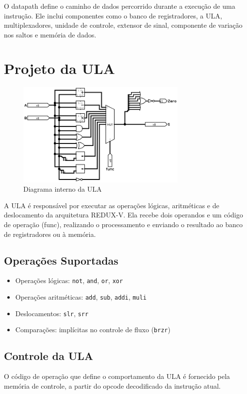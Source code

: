 \documentclass[12pt]{article}
\begin{document}
O datapath define o caminho de dados percorrido durante a execução de uma instrução. Ele inclui componentes como o banco de registradores, a ULA, multiplexadores, unidade de controle, extensor de sinal, componente de variação nos saltos e memória de dados.

\section{Projeto da ULA}

\begin{figure}[H]
\centering
\includegraphics[width=0.75\textwidth]{images/ALU.png}
\caption{Diagrama interno da ULA}
\label{fig:ula}
\end{figure}

A ULA é responsável por executar as operações lógicas, aritméticas e de deslocamento da arquitetura REDUX-V. Ela recebe dois operandos e um código de operação (func), realizando o processamento e enviando o resultado ao banco de registradores ou à memória.

\subsection{Operações Suportadas}
\begin{itemize}
  \item Operações lógicas: \texttt{not}, \texttt{and}, \texttt{or}, \texttt{xor}
  \item Operações aritméticas: \texttt{add}, \texttt{sub}, \texttt{addi}, \texttt{muli}
  \item Deslocamentos: \texttt{slr}, \texttt{srr}
  \item Comparações: implícitas no controle de fluxo (\texttt{brzr})
\end{itemize}

\subsection{Controle da ULA}
O código de operação que define o comportamento da ULA é fornecido pela memória de controle, a partir do opcode decodificado da instrução atual.
\end{document}

